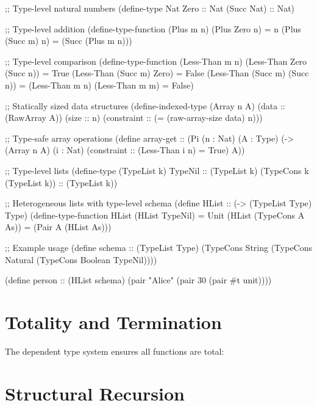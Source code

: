 \begin{example}
\begin{lambdustcode}
;; Type-level natural numbers  
(define-type Nat
  Zero :: Nat
  (Succ Nat) :: Nat)

;; Type-level addition
(define-type-function (Plus m n)
  (Plus Zero n) = n
  (Plus (Succ m) n) = (Succ (Plus m n)))

;; Type-level comparison
(define-type-function (Less-Than m n)  
  (Less-Than Zero (Succ n)) = True
  (Less-Than (Succ m) Zero) = False
  (Less-Than (Succ m) (Succ n)) = (Less-Than m n)
  (Less-Than m m) = False)

;; Statically sized data structures
(define-indexed-type (Array n A)
  (data :: (RawArray A))
  (size :: n)
  (constraint :: (= (raw-array-size data) n)))

;; Type-safe array operations
(define array-get :: (Pi (n : Nat) (A : Type) 
                         (-> (Array n A) 
                             (i : Nat) 
                             (constraint :: (Less-Than i n) = True)
                             A))

;; Type-level lists
(define-type (TypeList k)
  TypeNil :: (TypeList k)  
  (TypeCons k (TypeList k)) :: (TypeList k))

;; Heterogeneous lists with type-level schema
(define HList :: (-> (TypeList Type) Type)
(define-type-function HList
  (HList TypeNil) = Unit
  (HList (TypeCons A As)) = (Pair A (HList As)))

;; Example usage
(define schema :: (TypeList Type) 
  (TypeCons String (TypeCons Natural (TypeCons Boolean TypeNil))))

(define person :: (HList schema)  
  (pair "Alice" (pair 30 (pair #t unit))))
\end{lambdustcode}
\end{example}

\section{Totality and Termination}
\label{sec:totality}


The dependent type system ensures all functions are total:

\section{Structural Recursion}
\label{sec:structural-recursion}

